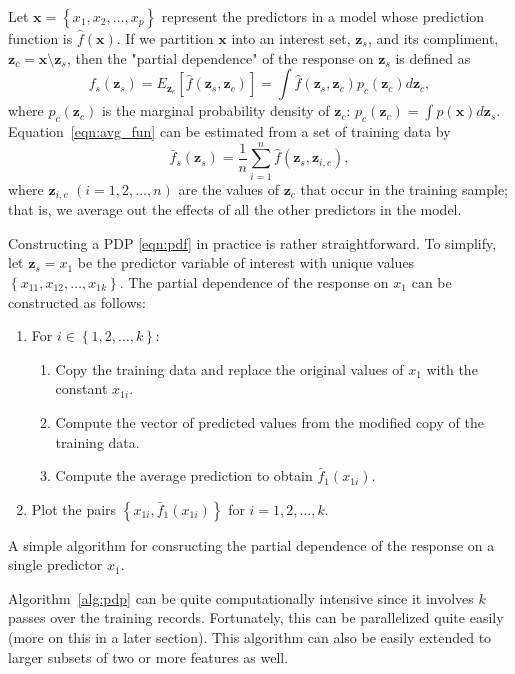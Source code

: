 Let $\boldsymbol{x} = \left\{x_1, x_2, \dots, x_p\right\}$ represent the predictors in a model whose prediction function is $\widehat{f}\left(\boldsymbol{x}\right)$. If we partition $\boldsymbol{x}$ into an interest set, $\boldsymbol{z}_s$, and its compliment, $\boldsymbol{z}_c = \boldsymbol{x} \setminus \boldsymbol{z}_s$, then the "partial dependence" of the response on $\boldsymbol{z}_s$ is defined as
\begin{equation}
\label{eqn:avg_fun}
  f_s\left(\boldsymbol{z}_s\right) = E_{\boldsymbol{z}_c}\left[\widehat{f}\left(\boldsymbol{z}_s, \boldsymbol{z}_c\right)\right] = \int \widehat{f}\left(\boldsymbol{z}_s, \boldsymbol{z}_c\right)p_{c}\left(\boldsymbol{z}_c\right)d\boldsymbol{z}_c,
\end{equation}
where $p_{c}\left(\boldsymbol{z}_c\right)$ is the marginal probability density of $\boldsymbol{z}_c$: $p_{c}\left(\boldsymbol{z}_c\right) = \int p\left(\boldsymbol{x}\right)d\boldsymbol{z}_s$.
Equation~\eqref{eqn:avg_fun} can be estimated from a set of training data by
\begin{equation}
\label{eqn:pdf}
\bar{f}_s\left(\boldsymbol{z}_s\right) = \frac{1}{n}\sum_{i = 1}^n\widehat{f}\left(\boldsymbol{z}_s,\boldsymbol{z}_{i, c}\right),
\end{equation}
where $\boldsymbol{z}_{i, c}$ $\left(i = 1, 2, \dots, n\right)$ are the values of $\boldsymbol{z}_c$ that occur in the training sample; that is, we average out the effects of all the other predictors in the model.

Constructing a PDP \eqref{eqn:pdf} in practice is rather straightforward. To simplify, let $\boldsymbol{z}_s = x_1$ be the predictor variable of interest with unique values $\left\{x_{11}, x_{12}, \dots, x_{1k}\right\}$. The partial dependence of the response on $x_1$ can be constructed as follows:

\begin{algorithm}
\begin{enumerate}
  \item For $i \in \left\{1, 2, \dots, k\right\}$:
  \begin{enumerate}
    \item Copy the training data and replace the original values of $x_1$ with the constant $x_{1i}$.
    \item Compute the vector of predicted values from the modified copy of the training data.
    \item Compute the average prediction to obtain $\bar{f}_1\left(x_{1i}\right)$.
  \end{enumerate}
  \item Plot the pairs $\left\{x_{1i}, \bar{f}_1\left(x_{1i}\right)\right\}$ for $i = 1, 2, \dotsc, k$.
\end{enumerate}
\caption{A simple algorithm for consructing the partial dependence of the response on a single predictor $x_1$. \label{alg:pdp}}
\end{algorithm}
Algorithm~\ref{alg:pdp} can be quite computationally intensive since it involves $k$ passes over the training records. Fortunately, this can be parallelized quite easily (more on this in a later section). This algorithm can also be easily extended to larger subsets of two or more features as well.

